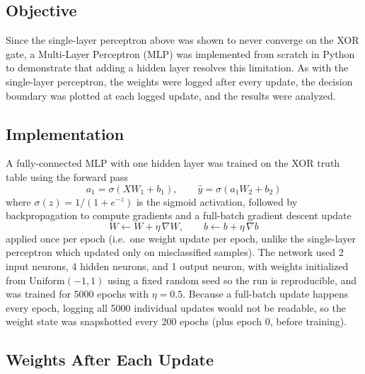 \documentclass[11pt]{article}
\begin{document}
\subsection*{Objective}
Since the single-layer perceptron above was shown to never converge on the XOR
gate, a Multi-Layer Perceptron (MLP) was implemented from scratch in Python to
demonstrate that adding a hidden layer resolves this limitation. As with the
single-layer perceptron, the weights were logged after every update, the
decision boundary was plotted at each logged update, and the results were
analyzed.

\subsection*{Implementation}
A fully-connected MLP with one hidden layer was trained on the XOR truth table
using the forward pass
\begin{equation}
    a_1 = \sigma(X W_1 + b_1), \qquad \hat{y} = \sigma(a_1 W_2 + b_2)
\end{equation}
where $\sigma(z) = 1/(1+e^{-z})$ is the sigmoid activation, followed by
backpropagation to compute gradients and a full-batch gradient descent update
\begin{equation}
    W \leftarrow W + \eta \, \nabla W, \qquad b \leftarrow b + \eta \, \nabla b
\end{equation}
applied once per epoch (i.e.\ one weight update per epoch, unlike the
single-layer perceptron which updated only on misclassified samples). The
network used 2 input neurons, 4 hidden neurons, and 1 output neuron, with
weights initialized from $\mathrm{Uniform}(-1,1)$ using a fixed random seed so
the run is reproducible, and was trained for 5000 epochs with $\eta = 0.5$.
Because a full-batch update happens every epoch, logging all 5000 individual
updates would not be readable, so the weight state was snapshotted every 200
epochs (plus epoch 0, before training).

\subsection*{Weights After Each Update}
\end{document}
